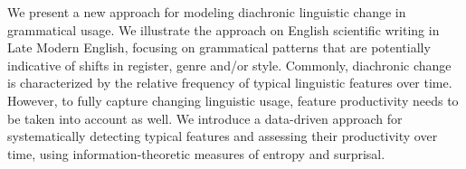 We present a new approach for modeling diachronic linguistic change in grammatical usage. We illustrate the approach on English scientific writing in Late Modern English, focusing on grammatical patterns that are potentially indicative of shifts in register, genre and/or style. Commonly, diachronic change is characterized by the relative frequency of typical linguistic features over time. However, to fully capture changing linguistic usage, feature productivity needs to be taken into account as well. We introduce a data-driven approach for systematically detecting typical features and assessing their productivity over time, using information-theoretic measures of entropy and surprisal.
